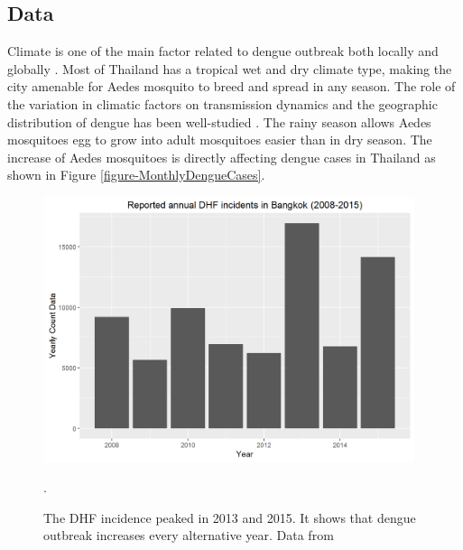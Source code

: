 \documentclass{bmcart}
\begin{document}
\subsection{Data}

Climate is one of the main factor related to dengue outbreak both locally and globally \cite{johansson2009multiyear, morin2013climate}. Most of Thailand has a tropical wet and dry climate type, making the city amenable for Aedes mosquito to breed and spread in any season. The role of the variation in climatic factors on transmission dynamics and the geographic distribution of dengue has been well-studied \cite{thai2011role}. The rainy season allows Aedes mosquitoes egg to grow into adult mosquitoes easier than in dry season. The increase of Aedes mosquitoes is directly affecting dengue cases in Thailand as shown in Figure \ref{figure-MonthlyDengueCases}.

\begin{figure}[htbp]
	\begin{center}
		\includegraphics[width= 0.97\textwidth]{3-AnuualDengueCases}
		\caption{The DHF incidence peaked in 2013 and 2015. It shows that dengue \\
      outbreak increases every alternative year. Data from \cite{denguethai2015}}.
		\label{figure-AnuualDengueCases}
	\end{center}
\end{figure}
\end{document}
